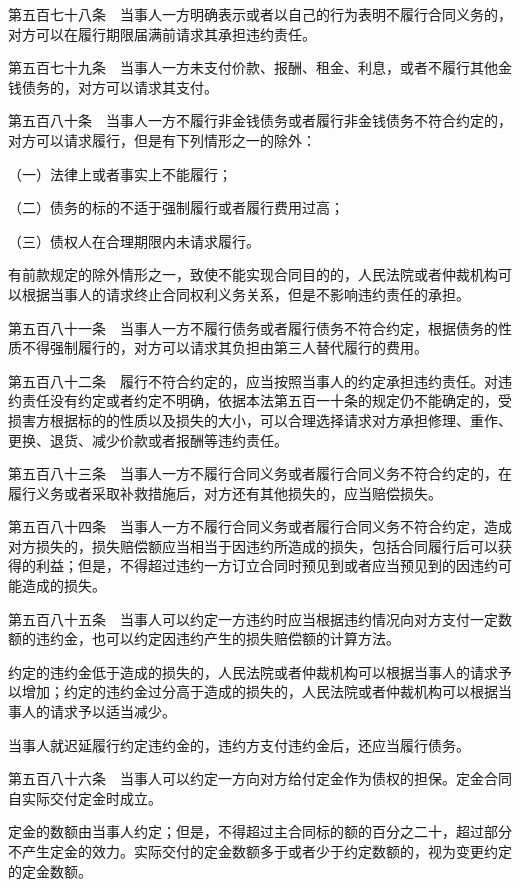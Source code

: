 \documentclass[UTF8,12pt,a4paper]{ctexbook}
\begin{document}
第五百七十八条　当事人一方明确表示或者以自己的行为表明不履行合同义务的，对方可以在履行期限届满前请求其承担违约责任。

第五百七十九条　当事人一方未支付价款、报酬、租金、利息，或者不履行其他金钱债务的，对方可以请求其支付。

第五百八十条　当事人一方不履行非金钱债务或者履行非金钱债务不符合约定的，对方可以请求履行，但是有下列情形之一的除外：

（一）法律上或者事实上不能履行；

（二）债务的标的不适于强制履行或者履行费用过高；

（三）债权人在合理期限内未请求履行。

有前款规定的除外情形之一，致使不能实现合同目的的，人民法院或者仲裁机构可以根据当事人的请求终止合同权利义务关系，但是不影响违约责任的承担。

第五百八十一条　当事人一方不履行债务或者履行债务不符合约定，根据债务的性质不得强制履行的，对方可以请求其负担由第三人替代履行的费用。

第五百八十二条　履行不符合约定的，应当按照当事人的约定承担违约责任。对违约责任没有约定或者约定不明确，依据本法第五百一十条的规定仍不能确定的，受损害方根据标的的性质以及损失的大小，可以合理选择请求对方承担修理、重作、更换、退货、减少价款或者报酬等违约责任。

第五百八十三条　当事人一方不履行合同义务或者履行合同义务不符合约定的，在履行义务或者采取补救措施后，对方还有其他损失的，应当赔偿损失。

第五百八十四条　当事人一方不履行合同义务或者履行合同义务不符合约定，造成对方损失的，损失赔偿额应当相当于因违约所造成的损失，包括合同履行后可以获得的利益；但是，不得超过违约一方订立合同时预见到或者应当预见到的因违约可能造成的损失。

第五百八十五条　当事人可以约定一方违约时应当根据违约情况向对方支付一定数额的违约金，也可以约定因违约产生的损失赔偿额的计算方法。

约定的违约金低于造成的损失的，人民法院或者仲裁机构可以根据当事人的请求予以增加；约定的违约金过分高于造成的损失的，人民法院或者仲裁机构可以根据当事人的请求予以适当减少。

当事人就迟延履行约定违约金的，违约方支付违约金后，还应当履行债务。

第五百八十六条　当事人可以约定一方向对方给付定金作为债权的担保。定金合同自实际交付定金时成立。

定金的数额由当事人约定；但是，不得超过主合同标的额的百分之二十，超过部分不产生定金的效力。实际交付的定金数额多于或者少于约定数额的，视为变更约定的定金数额。
\end{document}
